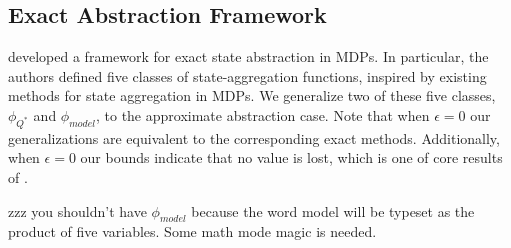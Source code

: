 \subsection{Exact Abstraction Framework}

 developed a framework for exact state abstraction in \acp{MDP}. In particular, the authors defined five classes of state-aggregation functions, inspired by existing methods for state aggregation in \acp{MDP}. We generalize two of these five classes, $\phi_{Q^*}$ and $\phi_{model}$, to the approximate abstraction case. Note that when $\epsilon=0$ our generalizations are equivalent to the corresponding exact methods. Additionally, when $\epsilon=0$ our bounds indicate that no value is lost, which is one of core results of .

zzz you shouldn't have $\phi_{model}$ because the word model will be typeset as the product of five variables. Some math mode magic is needed.
